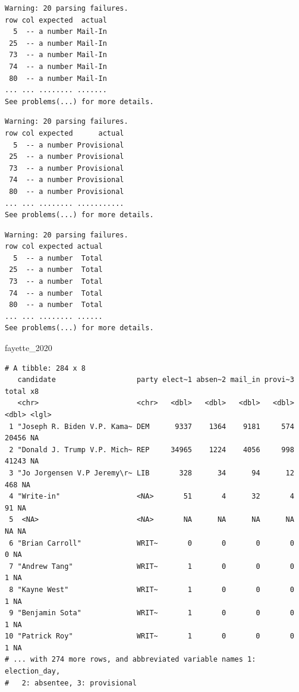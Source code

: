 \documentclass[
  letterpaper,
  DIV=11,
  numbers=noendperiod]{scrreprt}
\newenvironment{Shaded}{\begin{snugshade}}{\end{snugshade}}
\newcommand{\NormalTok}[1]{\textcolor[rgb]{0.00,0.23,0.31}{#1}}
\begin{document}
\begin{verbatim}
Warning: 20 parsing failures.
row col expected  actual
  5  -- a number Mail-In
 25  -- a number Mail-In
 73  -- a number Mail-In
 74  -- a number Mail-In
 80  -- a number Mail-In
... ... ........ .......
See problems(...) for more details.
\end{verbatim}

\begin{verbatim}
Warning: 20 parsing failures.
row col expected      actual
  5  -- a number Provisional
 25  -- a number Provisional
 73  -- a number Provisional
 74  -- a number Provisional
 80  -- a number Provisional
... ... ........ ...........
See problems(...) for more details.
\end{verbatim}

\begin{verbatim}
Warning: 20 parsing failures.
row col expected actual
  5  -- a number  Total
 25  -- a number  Total
 73  -- a number  Total
 74  -- a number  Total
 80  -- a number  Total
... ... ........ ......
See problems(...) for more details.
\end{verbatim}

\begin{Shaded}
\begin{Highlighting}[]
\NormalTok{fayette\_2020}
\end{Highlighting}
\end{Shaded}

\begin{verbatim}
# A tibble: 284 x 8
   candidate                   party elect~1 absen~2 mail_in provi~3 total x8   
   <chr>                       <chr>   <dbl>   <dbl>   <dbl>   <dbl> <dbl> <lgl>
 1 "Joseph R. Biden V.P. Kama~ DEM      9337    1364    9181     574 20456 NA   
 2 "Donald J. Trump V.P. Mich~ REP     34965    1224    4056     998 41243 NA   
 3 "Jo Jorgensen V.P Jeremy\r~ LIB       328      34      94      12   468 NA   
 4 "Write-in"                  <NA>       51       4      32       4    91 NA   
 5  <NA>                       <NA>       NA      NA      NA      NA    NA NA   
 6 "Brian Carroll"             WRIT~       0       0       0       0     0 NA   
 7 "Andrew Tang"               WRIT~       1       0       0       0     1 NA   
 8 "Kayne West"                WRIT~       1       0       0       0     1 NA   
 9 "Benjamin Sota"             WRIT~       1       0       0       0     1 NA   
10 "Patrick Roy"               WRIT~       1       0       0       0     1 NA   
# ... with 274 more rows, and abbreviated variable names 1: election_day,
#   2: absentee, 3: provisional
\end{verbatim}
\end{document}
